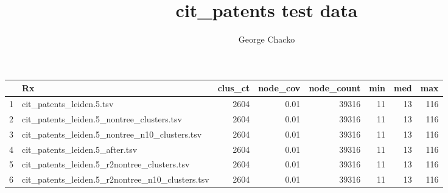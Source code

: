 \documentclass[11pt, oneside]{article}   	%
\title{cit\_patents test data}
\author{George Chacko}
\begin{document}
\maketitle

\begin{table}[ht]
\centering
\begin{adjustbox}{width=0.9\textwidth}
\begin{tabular}{rlrrrrrr}
  \hline
 & Rx & clus\_ct & node\_cov & node\_count & min & med & max \\ 
  \hline
 1 & cit\_patents\_leiden.5.tsv & 2604 & 0.01 & 39316 &  11 &  13 & 116 \\ 
 2 & cit\_patents\_leiden.5\_nontree\_clusters.tsv & 2604 & 0.01 & 39316 &  11 &  13 & 116 \\ 
 3 & cit\_patents\_leiden.5\_nontree\_n10\_clusters.tsv & 2604 & 0.01 & 39316 &  11 &  13 & 116 \\ 
 4 & cit\_patents\_leiden.5\_after.tsv & 2604 & 0.01 & 39316 &  11 &  13 & 116 \\ 
 5 & cit\_patents\_leiden.5\_r2nontree\_clusters.tsv & 2604 & 0.01 & 39316 &  11 &  13 & 116 \\ 
 6 & cit\_patents\_leiden.5\_r2nontree\_n10\_clusters.tsv & 2604 & 0.01 & 39316 &  11 &  13 & 116 \\ 
   \hline
\end{tabular}
\end{adjustbox}
\end{table}
\end{document}
